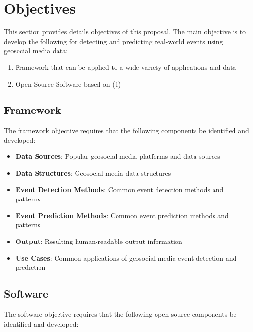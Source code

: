 \section{Objectives} \label{objectives}

This section provides details objectives of this proposal. The main objective is to develop the following for detecting and predicting real-world events using geosocial media data:

\begin{enumerate}
	\item Framework that can be applied to a wide variety of applications and data
	\item Open Source Software based on (1)
\end{enumerate}

\subsection{Framework} \label{framework}

The framework objective requires that the following components be identified and developed:

\begin{itemize}
	\item \textbf{Data Sources}: Popular geosocial media platforms and data sources
	\item \textbf{Data Structures}: Geosocial media data structures
	\item \textbf{Event Detection Methods}: Common event detection methods and patterns
	\item \textbf{Event Prediction Methods}: Common event prediction methods and patterns
	\item \textbf{Output}: Resulting human-readable output information
	\item \textbf{Use Cases}: Common applications of geosocial media event detection and prediction
\end{itemize}

\subsection{Software} \label{software}

The software objective requires that the following open source components be identified and developed:

